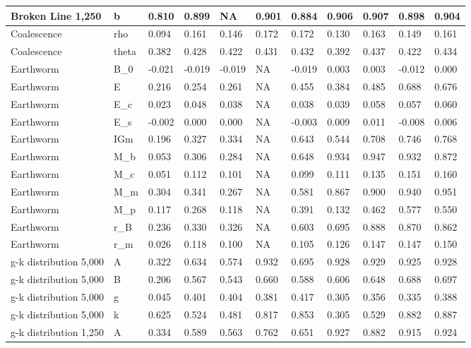 \documentclass[]{article}
\begin{document}
\begin{tabular}{l|l|l|l|l|l|l|l|l|l|l}
\hline
Broken Line 1,250 & b & 0.810 & 0.899 & NA & 0.901 & 0.884 & 0.906 & 0.907 & 0.898 & 0.904\\
\hline
Coalescence & rho & 0.094 & 0.161 & 0.146 & 0.172 & 0.172 & 0.130 & 0.163 & 0.149 & 0.161\\
\hline
Coalescence & theta & 0.382 & 0.428 & 0.422 & 0.431 & 0.432 & 0.392 & 0.437 & 0.422 & 0.434\\
\hline
Earthworm & B\_0 & -0.021 & -0.019 & -0.019 & NA & -0.019 & 0.003 & 0.003 & -0.012 & 0.000\\
\hline
Earthworm & E & 0.216 & 0.254 & 0.261 & NA & 0.455 & 0.384 & 0.485 & 0.688 & 0.676\\
\hline
Earthworm & E\_c & 0.023 & 0.048 & 0.038 & NA & 0.038 & 0.039 & 0.058 & 0.057 & 0.060\\
\hline
Earthworm & E\_s & -0.002 & 0.000 & 0.000 & NA & -0.003 & 0.009 & 0.011 & -0.008 & 0.006\\
\hline
Earthworm & IGm & 0.196 & 0.327 & 0.334 & NA & 0.643 & 0.544 & 0.708 & 0.746 & 0.768\\
\hline
Earthworm & M\_b & 0.053 & 0.306 & 0.284 & NA & 0.648 & 0.934 & 0.947 & 0.932 & 0.872\\
\hline
Earthworm & M\_c & 0.051 & 0.112 & 0.101 & NA & 0.099 & 0.111 & 0.135 & 0.151 & 0.160\\
\hline
Earthworm & M\_m & 0.304 & 0.341 & 0.267 & NA & 0.581 & 0.867 & 0.900 & 0.940 & 0.951\\
\hline
Earthworm & M\_p & 0.117 & 0.268 & 0.118 & NA & 0.391 & 0.132 & 0.462 & 0.577 & 0.550\\
\hline
Earthworm & r\_B & 0.236 & 0.330 & 0.326 & NA & 0.603 & 0.695 & 0.888 & 0.870 & 0.862\\
\hline
Earthworm & r\_m & 0.026 & 0.118 & 0.100 & NA & 0.105 & 0.126 & 0.147 & 0.147 & 0.150\\
\hline
g-k distribution 5,000 & A & 0.322 & 0.634 & 0.574 & 0.932 & 0.695 & 0.928 & 0.929 & 0.925 & 0.928\\
\hline
g-k distribution 5,000 & B & 0.206 & 0.567 & 0.543 & 0.660 & 0.588 & 0.606 & 0.648 & 0.688 & 0.697\\
\hline
g-k distribution 5,000 & g & 0.045 & 0.401 & 0.404 & 0.381 & 0.417 & 0.305 & 0.356 & 0.335 & 0.388\\
\hline
g-k distribution 5,000 & k & 0.625 & 0.524 & 0.481 & 0.817 & 0.853 & 0.305 & 0.529 & 0.882 & 0.887\\
\hline
g-k distribution 1,250 & A & 0.334 & 0.589 & 0.563 & 0.762 & 0.651 & 0.927 & 0.882 & 0.915 & 0.924\\

\end{tabular}
\end{document}
